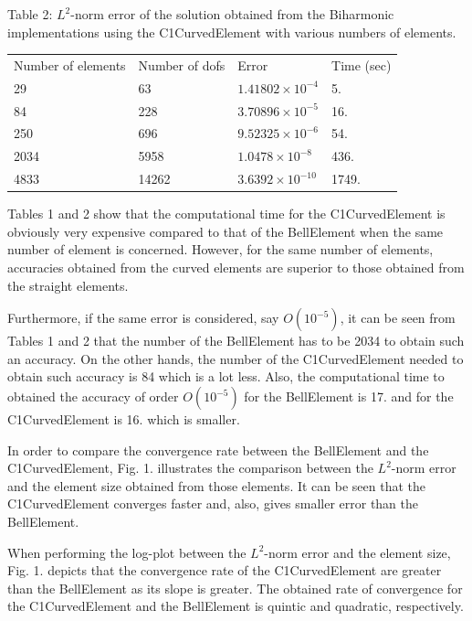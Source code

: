 Table 2\+: $L^2$-\/norm error of the solution obtained from the Biharmonic implementations using the C1\+Curved\+Element with various numbers of elements.

\begin{center} \tabulinesep=1mm
\begin{longtabu} spread 0pt [c]{*{4}{|X[-1]}|}
\hline
Number of elements  &Number of dofs  &Error  &Time (sec)   \\
29  &63  &$ 1.41802 \times 10^{-4} $  &5.   \\
84  &228  &$ 3.70896 \times 10^{-5} $  &16.   \\
250  &696  &$ 9.52325 \times 10^{-6} $  &54.   \\
2034  &5958  &$ 1.0478 \times 10^{-8} $  &436.   \\
4833  &14262  &$ 3.6392 \times 10^{-10} $  &1749.     \\
\end{longtabu}
\end{center} 

Tables 1 and 2 show that the computational time for the {\ttfamily C1\+Curved\+Element} is obviously very expensive compared to that of the {\ttfamily Bell\+Element} when the same number of element is concerned. However, for the same number of elements, accuracies obtained from the curved elements are superior to those obtained from the straight elements.

Furthermore, if the same error is considered, say $O(10^{-5})$, it can be seen from Tables 1 and 2 that the number of the {\ttfamily Bell\+Element} has to be 2034 to obtain such an accuracy. On the other hands, the number of the {\ttfamily C1\+Curved\+Element} needed to obtain such accuracy is 84 which is a lot less. Also, the computational time to obtained the accuracy of order $O(10^{-5})$ for the {\ttfamily Bell\+Element} is 17. and for the {\ttfamily C1\+Curved\+Element} is 16. which is smaller.

In order to compare the convergence rate between the {\ttfamily Bell\+Element} and the {\ttfamily C1\+Curved\+Element}, Fig. 1. illustrates the comparison between the $L^2$-\/norm error and the element size obtained from those elements. It can be seen that the {\ttfamily C1\+Curved\+Element} converges faster and, also, gives smaller error than the {\ttfamily Bell\+Element}.

When performing the log-\/plot between the $L^2$-\/norm error and the element size, Fig. 1. depicts that the convergence rate of the {\ttfamily C1\+Curved\+Element} are greater than the {\ttfamily Bell\+Element} as its slope is greater. The obtained rate of convergence for the {\ttfamily C1\+Curved\+Element} and {\ttfamily the} Bell\+Element is quintic and quadratic, respectively.

